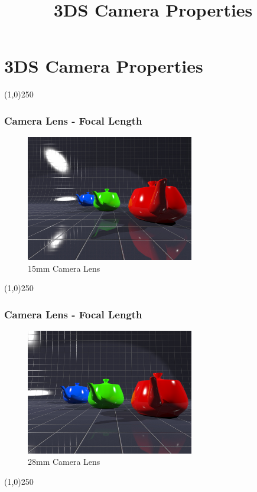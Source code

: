 \section{3DS Camera Properties}
\begin{frame}
\title[3DS Camera Properties]{3DS Camera Properties}
\titlepage
\end{frame}\begin{center}\line(1,0){250}\end{center}

\begin{frame}
\frametitle{Camera Lens - Focal Length}
\begin{figure}
	\centering
	\includegraphics[height=5.5cm]{img/Cameras/15mm.jpg}
	\caption[15mm Camera Lens]{15mm Camera Lens}
	\label{fig:15mm}
\end{figure}
\end{frame}
\begin{center}\line(1,0){250}\end{center}


\begin{frame}
\frametitle{Camera Lens - Focal Length}
\begin{figure}
	\centering
	\includegraphics[height=5.5cm]{img/Cameras/28mm.jpg}
	\caption[28mm Camera Lens]{28mm Camera Lens}
	\label{fig:28mm}
\end{figure}
\end{frame}
\begin{center}\line(1,0){250}\end{center}


